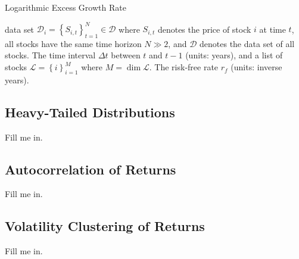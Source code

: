 \documentclass[11pt]{article}
\theoremstyle{definition}
\begin{document}
\begin{algorithm}[h]
    \caption{Logarithmic Excess Growth Rate}\label{algo-log-return-distributions-equity}
    \begin{algorithmic}[1]

        \Statex
        \Require data set $\mathcal{D}_{i} = \left\{S_{i,t}\right\}_{t=1}^{N}\in\mathcal{D}$ where $S_{i,t}$ denotes the price of stock $i$ at time $t$, all stocks have the same time horizon $N\gg{2}$, 
		and $\mathcal{D}$ denotes the data set of all stocks.
        \Require The time interval $\Delta{t}$ between $t$ and $t-1$ (units: years), and a list of stocks $\mathcal{L} = \left\{i\right\}_{i=1}^{M}$ where $M = \dim\mathcal{L}$.
        \Require The risk-free rate $r_{f}$ (units: inverse years).
     
        \Statex
            \EndFor
        \EndFor
        \Statex
		\EndProcedure
    \end{algorithmic}
\end{algorithm}

\subsection{Heavy-Tailed Distributions}\label{sec:heavy-tailed-distributions}
Fill me in.

\subsection{Autocorrelation of Returns}\label{sec:autocorrelation-of-returns}
Fill me in.

\subsection{Volatility Clustering of Returns}\label{sec:volatility-clustering-of-returns}
Fill me in.
\end{document}
